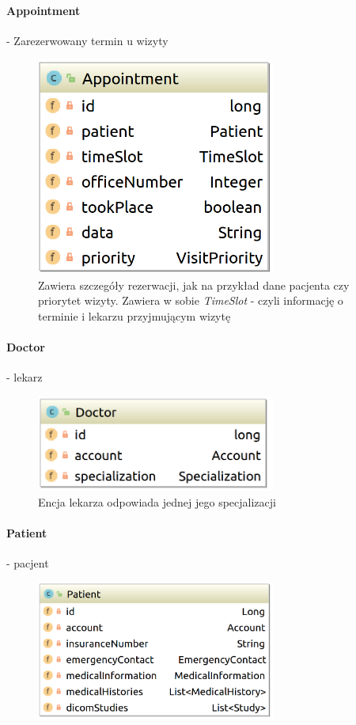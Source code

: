 \documentclass[polish,12pt]{aghthesis}
\begin{document}
    \paragraph{Appointment} - Zarezerwowany termin u wizyty
    \begin{figure}[H]
    \includegraphics[width=0.7\textwidth]{Appointment}
    \caption{Zawiera szczegóły rezerwacji, jak na przykład dane pacjenta czy priorytet wizyty.
    Zawiera w sobie \emph{TimeSlot} - czyli informację o terminie i lekarzu przyjmującym wizytę}
    \end{figure}
    \paragraph{Doctor} - lekarz 
    \begin{figure}[H] 
    \includegraphics[width=0.7\textwidth]{Doctor} 
    \caption{Encja lekarza odpowiada jednej jego specjalizacji}
    \end{figure}
    \paragraph{Patient} - pacjent 
    \begin{figure}[H]
    \includegraphics[width=0.7\textwidth]{Patient}
    \end{figure}
\end{document}
